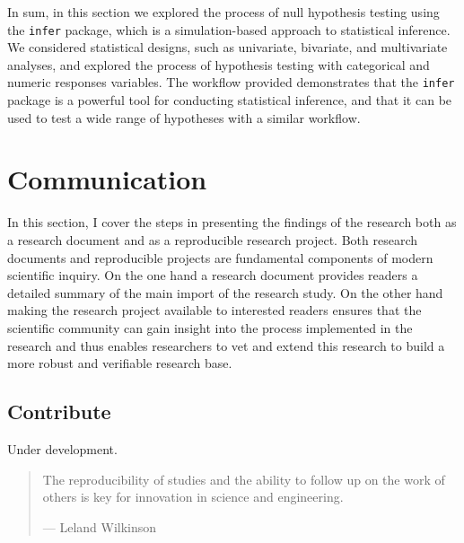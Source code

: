\documentclass[
  letterpaper,
]{latex/krantz}
\theoremstyle{definition}
\theoremstyle{remark}
\begin{document}

In sum, in this section we explored the process of null hypothesis
testing using the \texttt{infer} package, which is a simulation-based
approach to statistical inference. We considered statistical designs,
such as univariate, bivariate, and multivariate analyses, and explored
the process of hypothesis testing with categorical and numeric responses
variables. The workflow provided demonstrates that the \texttt{infer}
package is a powerful tool for conducting statistical inference, and
that it can be used to test a wide range of hypotheses with a similar
workflow.

\part{Communication}

In this section, I cover the steps in presenting the findings of the
research both as a research document and as a reproducible research
project. Both research documents and reproducible projects are
fundamental components of modern scientific inquiry. On the one hand a
research document provides readers a detailed summary of the main import
of the research study. On the other hand making the research project
available to interested readers ensures that the scientific community
can gain insight into the process implemented in the research and thus
enables researchers to vet and extend this research to build a more
robust and verifiable research base.

\chapter{Contribute}\label{sec-contribute-chapter}

\begin{tcolorbox}[enhanced jigsaw, toprule=.15mm, breakable, colback=white, leftrule=.75mm, bottomrule=.15mm, colframe=quarto-callout-caution-color-frame, bottomtitle=1mm, colbacktitle=quarto-callout-caution-color!10!white, opacitybacktitle=0.6, rightrule=.15mm, coltitle=black, toptitle=1mm, title=\textcolor{quarto-callout-caution-color}{\faFire}\hspace{0.5em}{Caution}, titlerule=0mm, left=2mm, arc=.35mm, opacityback=0]

Under development.

\end{tcolorbox}

\begin{quote}
The reproducibility of studies and the ability to follow up on the work
of others is key for innovation in science and engineering.

--- Leland Wilkinson
\end{quote}
\end{document}
